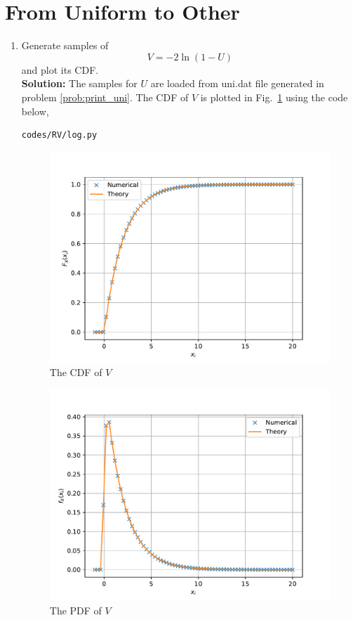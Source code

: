 \documentclass[journal,8pt,onecolumn]{IEEEtran}
\newcommand\figref{Fig.~\ref}
\providecommand{\brak}[1]{\ensuremath{\left(#1\right)}}
\newcommand{\solution}{\noindent \textbf{Solution: }}
\begin{document}
\section{From Uniform to Other}
\begin{enumerate}
%
\item
Generate samples of 
%
\begin{equation}
V = -2\ln\brak{1-U}
\end{equation}
%
and plot its CDF. \\
\solution The samples for $U$ are loaded from uni.dat file generated in problem \ref{prob:print_uni}. The CDF of $V$ is plotted in \figref{fig:log_uni_cdf} using the code below, 
\begin{lstlisting}
codes/RV/log.py
\end{lstlisting}
\begin{figure}[H]
\centering
\includegraphics[width=\columnwidth/2]{./figs/log_uni_cdf.pdf}
\caption{The CDF of $V$}
\label{fig:log_uni_cdf}
\end{figure}
\begin{figure}[H]
\centering
\includegraphics[width=\columnwidth/2]{./figs/log_uni_pdf.pdf}
\caption{The PDF of $V$}
\label{fig:log_uni_pdf}
\end{figure}


\end{enumerate}
\end{document}
